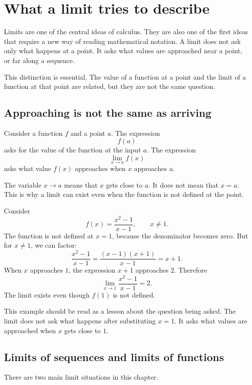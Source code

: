 \section{What a limit tries to describe}

Limits are one of the central ideas of calculus. They are also one of the first ideas that require a new way of reading mathematical notation. A limit does not ask only what happens at a point. It asks what values are approached near a point, or far along a sequence.

This distinction is essential. The value of a function at a point and the limit of a function at that point are related, but they are not the same question.

\subsection*{Approaching is not the same as arriving}

Consider a function \(f\) and a point \(a\). The expression
\[
f(a)
\]
asks for the value of the function at the input \(a\). The expression
\[
\lim_{x\to a} f(x)
\]
asks what value \(f(x)\) approaches when \(x\) approaches \(a\).

The variable \(x\to a\) means that \(x\) gets close to \(a\). It does not mean that \(x=a\). This is why a limit can exist even when the function is not defined at the point.

\begin{examplebox}
Consider
\[
f(x)=\frac{x^2-1}{x-1},
\qquad x\ne1.
\]
The function is not defined at \(x=1\), because the denominator becomes zero. But for \(x\ne1\), we can factor:
\[
\frac{x^2-1}{x-1}=\frac{(x-1)(x+1)}{x-1}=x+1.
\]
When \(x\) approaches \(1\), the expression \(x+1\) approaches \(2\). Therefore
\[
\lim_{x\to1}\frac{x^2-1}{x-1}=2.
\]
The limit exists even though \(f(1)\) is not defined.
\end{examplebox}

This example should be read as a lesson about the question being asked. The limit does not ask what happens after substituting \(x=1\). It asks what values are approached when \(x\) gets close to \(1\).

\subsection*{Limits of sequences and limits of functions}

There are two main limit situations in this chapter.

